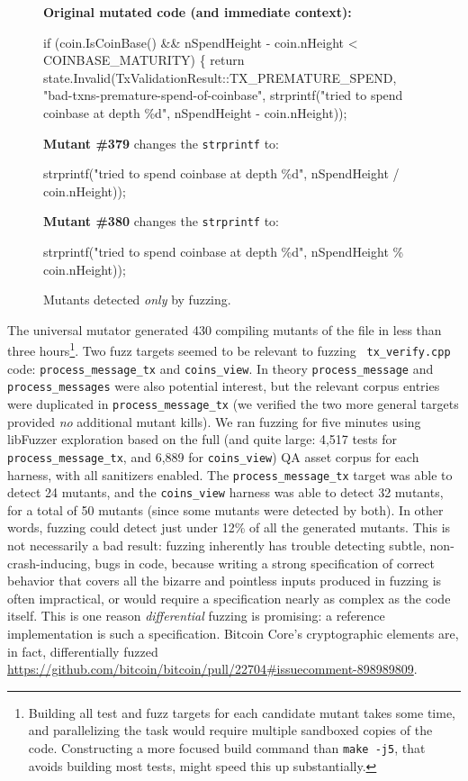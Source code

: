 \begin{sloppypar}
\begin{figure}
\raggedright
{\scriptsize
{\bf Original mutated code (and immediate context):}

\begin{code}
    if (coin.IsCoinBase() \&\& nSpendHeight - coin.nHeight < COINBASE\_MATURITY) \{
            return state.Invalid(TxValidationResult::TX\_PREMATURE\_SPEND, "bad-txns-premature-spend-of-coinbase",
                strprintf("tried to spend coinbase at depth \%d", nSpendHeight - coin.nHeight));
\end{code}

{\bf Mutant \#379} changes the {\tt strprintf} to:

\begin{code}
strprintf("tried to spend coinbase at depth \%d", nSpendHeight / coin.nHeight));
\end{code}

{\bf Mutant \#380} changes the {\tt strprintf} to:

\begin{code}
strprintf("tried to spend coinbase at depth \%d", nSpendHeight \% coin.nHeight));
\end{code}
}
\caption{Mutants detected \emph{only} by fuzzing.}
\label{mkills}
\end{figure}

The universal mutator generated 430 compiling mutants of the file in
less than three hours\footnote{Building all test and fuzz targets for each
candidate mutant takes some time, and parallelizing the task would
require multiple sandboxed copies of the code. Constructing a more
focused build command than {\tt make -j5}, that avoids building most tests, might speed this up substantially.}.
Two fuzz targets seemed to be relevant to fuzzing {\tt
  tx\_verify.cpp} code: {\tt process\_message\_tx} and {\tt coins\_view}.
In theory {\tt process\_message} and {\tt process\_messages} were
also potential interest, but the relevant corpus entries were
duplicated in {\tt process\_message\_tx} (we verified the two more
general targets provided \emph{no}
additional mutant kills). We ran fuzzing for five minutes using
libFuzzer exploration based on the full (and quite large: 4,517 tests for
{\tt process\_message\_tx}, and 6,889 for {\tt coins\_view}) QA asset corpus for each
harness, with all sanitizers enabled. The {\tt process\_message\_tx} target was
able to detect 24 mutants, and the {\tt coins\_view} harness was able to detect
32 mutants, for a total of 50 mutants (since some mutants were
detected by both). In other words, fuzzing could detect just under 12\%
of all the generated mutants. This is not necessarily a bad result: fuzzing inherently has
trouble detecting subtle, non-crash-inducing, bugs in code, because writing a
strong specification of correct behavior that covers all the bizarre and
pointless inputs produced in fuzzing is often impractical, or would require a
specification nearly as complex as the code itself. This is one reason
\emph{differential} fuzzing is promising: a reference implementation is such a
specification. Bitcoin Core's cryptographic elements are, in fact,
differentially fuzzed
\url{https://github.com/bitcoin/bitcoin/pull/22704#issuecomment-898989809}.
\end{sloppypar}


